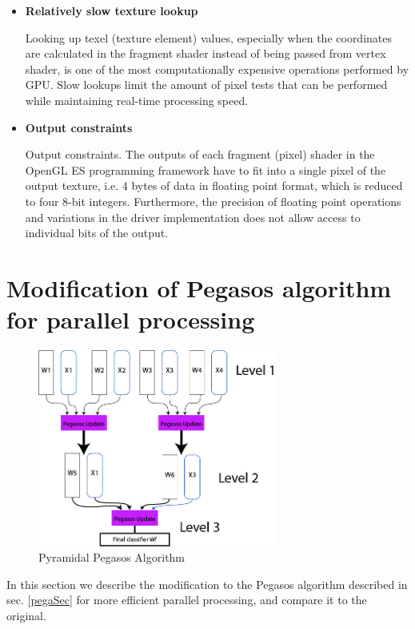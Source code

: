\begin {itemize}
As was partially mentioned in the above point, possibly the only tool available for the synchronization between data operation in OpenGL ES is waiting for all GL render calls to complete. This decreases efficiency drastically. 

\item {\bf Relatively slow texture lookup}

 Looking up texel (texture element) values, especially when the coordinates are calculated in the fragment shader instead of being passed from vertex shader, is one of the most computationally expensive operations performed by GPU. Slow lookups limit the amount of pixel tests that can be performed while maintaining real-time processing speed.

\item {\bf Output constraints}

Output constraints. The outputs of each fragment (pixel) shader in the OpenGL ES programming framework have to fit into a single pixel of the output texture, i.e. 4 bytes of data in floating point format, which is reduced to four 8-bit integers. Furthermore, the precision of floating point operations and variations in the driver implementation does not allow access to individual bits of the output. 

\end{itemize}

\section{Modification of Pegasos algorithm for parallel processing}
\begin{figure}[t]
		\centering
		\includegraphics[width=0.7\textwidth]{pyrapega}
		\caption{Pyramidal Pegasos Algorithm}
		\label{pyra}
	\end{figure}
In this section we describe the modification to the Pegasos algorithm described in sec. \ref{pegaSec} for more efficient parallel processing, and compare it to the original.
